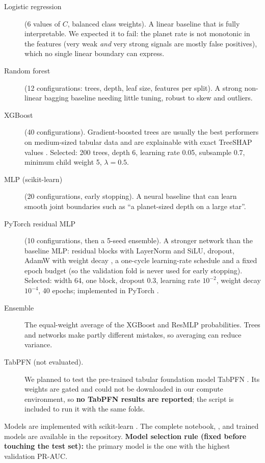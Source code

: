 \documentclass[11pt,a4paper]{article}
\begin{document}
\begin{description}
\item[Logistic regression] (6 values of $C$, balanced class weights). A linear baseline that is fully interpretable. We expected it to fail: the planet rate is not monotonic in the features (very weak \emph{and} very strong signals are mostly false positives), which no single linear boundary can express.
\item[Random forest] (12 configurations: trees, depth, leaf size, features per split). A strong non-linear bagging baseline needing little tuning, robust to skew and outliers.
\item[XGBoost] \citep{chen2016} (40 configurations). Gradient-boosted trees are usually the best performers on medium-sized tabular data and are explainable with exact TreeSHAP values \citep{lundberg2020}. Selected: 200 trees, depth 6, learning rate 0.05, subsample 0.7, minimum child weight 5, $\lambda = 0.5$.
\item[MLP (scikit-learn)] (20 configurations, early stopping). A neural baseline that can learn smooth joint boundaries such as ``a planet-sized depth on a large star''.
\item[PyTorch residual MLP] (10 configurations, then a 5-seed ensemble). A stronger network than the baseline MLP: residual blocks with LayerNorm and SiLU, dropout, AdamW with weight decay \citep{loshchilov2019}, a one-cycle learning-rate schedule \citep{smith2019} and a fixed epoch budget (so the validation fold is never used for early stopping). Selected: width 64, one block, dropout 0.3, learning rate $10^{-2}$, weight decay $10^{-4}$, 40 epochs; implemented in PyTorch \citep{paszke2019}.
\item[Ensemble] The equal-weight average of the XGBoost and ResMLP probabilities. Trees and networks make partly different mistakes, so averaging can reduce variance.
\item[TabPFN (not evaluated).] We planned to test the pre-trained tabular foundation model TabPFN \citep{hollmann2025}. Its weights are gated and could not be downloaded in our compute environment, so \textbf{no TabPFN results are reported}; the script  is included to run it with the same folds.
\end{description}
Models are implemented with scikit-learn \citep{pedregosa2011}. The complete notebook, , and trained models are available in the repository. \textbf{Model selection rule (fixed before touching the test set):} the primary model is the one with the highest validation PR-AUC.
\end{document}
